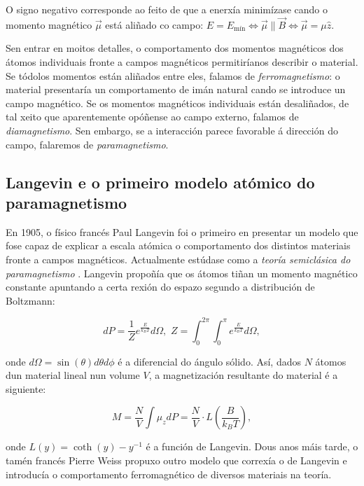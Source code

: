 \begin{refsection}
\begin{multicols}{2}
O signo negativo corresponde ao feito de que a enerxía minimízase cando o
momento magnético $\vec \mu$ está aliñado co campo: $E=E_\mathrm{mín}
\Leftrightarrow \vec \mu \parallel \vec B \Leftrightarrow \vec \mu=\mu \hat z$. 

Sen entrar en moitos detalles, o comportamento dos momentos magnéticos dos
átomos individuais fronte a campos magnéticos permitiríanos describir o
material. Se tódolos momentos están aliñados entre eles, falamos de
\emph{ferromagnetismo}: o material presentaría un comportamento de imán natural
cando se introduce un campo magnético. Se os momentos magnéticos individuais
están desaliñados, de tal xeito que aparentemente opóñense ao campo externo,
falamos de \emph{diamagnetismo}. Sen embargo, se a interacción parece favorable
á dirección do campo, falaremos de \emph{paramagnetismo}.

\subsection*{Langevin e o primeiro modelo atómico do paramagnetismo}

En 1905, o físico francés Paul Langevin foi o primeiro en presentar un modelo
que fose capaz de explicar a escala atómica o comportamento dos distintos
materiais fronte a campos magnéticos. Actualmente estúdase como a \emph{teoría
semiclásica do paramagnetismo} \cite[Sec. 2.1.4.]{blundell.s_2001}. Langevin
propoñía que os átomos tiñan un momento magnético constante apuntando a certa
rexión do espazo segundo a distribución de Boltzmann:

\begin{equation}\label{ec.: bvl_boltzmann}
    dP = \frac{1}{Z}e^{\frac{E}{k_B T}}d\Omega,\,\, Z
    =\int_{0}^{2\pi}\int_{0}^{\pi}e^{\frac{E}{k_B T}}d\Omega,
\end{equation}

onde $d\Omega = \sin(\theta)d\theta d\phi$ é a diferencial do ángulo sólido.
Así, dados $N$ átomos dun material lineal nun volume $V$, a magnetización
resultante do material é a siguiente:

\begin{equation}\label{ec.: blv_langevin}
    M = \frac{N}{V} \int\mu_zdP = \frac{N}{V}\cdot
    L\left(\frac{B}{k_B T}\right),
\end{equation}

onde $L(y) = \coth(y)-y^{-1}$ é a función de Langevin. Dous anos máis tarde, o
tamén francés Pierre Weiss propuxo outro modelo que correxía o de Langevin e
introducía o comportamento ferromagnético de diversos materiais na teoría.


\end{multicols}
\end{refsection}
